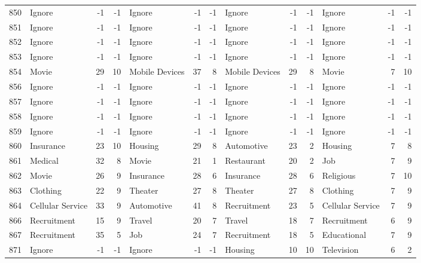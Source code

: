 \begin{figure}[htbp]
\begin{tabular}{rlrrlrrlrrlrr}
    850   & Ignore & -1    & -1    & Ignore & -1    & -1    & Ignore & -1    & -1    & Ignore & -1    & -1 \\
    851   & Ignore & -1    & -1    & Ignore & -1    & -1    & Ignore & -1    & -1    & Ignore & -1    & -1 \\
    852   & Ignore & -1    & -1    & Ignore & -1    & -1    & Ignore & -1    & -1    & Ignore & -1    & -1 \\
    853   & Ignore & -1    & -1    & Ignore & -1    & -1    & Ignore & -1    & -1    & Ignore & -1    & -1 \\
    854   & Movie & 29    & 10    & Mobile Devices & 37    & 8     & Mobile Devices & 29    & 8     & Movie & 7     & 10 \\
    856   & Ignore & -1    & -1    & Ignore & -1    & -1    & Ignore & -1    & -1    & Ignore & -1    & -1 \\
    857   & Ignore & -1    & -1    & Ignore & -1    & -1    & Ignore & -1    & -1    & Ignore & -1    & -1 \\
    858   & Ignore & -1    & -1    & Ignore & -1    & -1    & Ignore & -1    & -1    & Ignore & -1    & -1 \\
    859   & Ignore & -1    & -1    & Ignore & -1    & -1    & Ignore & -1    & -1    & Ignore & -1    & -1 \\
    860   & Insurance & 23    & 10    & Housing & 29    & 8     & Automotive & 23    & 2     & Housing & 7     & 8 \\
    861   & Medical & 32    & 8     & Movie & 21    & 1     & Restaurant & 20    & 2     & Job   & 7     & 9 \\
    862   & Movie & 26    & 9     & Insurance & 28    & 6     & Insurance & 28    & 6     & Religious & 7     & 10 \\
    863   & Clothing & 22    & 9     & Theater & 27    & 8     & Theater & 27    & 8     & Clothing & 7     & 9 \\
    864   & Cellular Service & 33    & 9     & Automotive & 41    & 8     & Recruitment & 23    & 5     & Cellular Service & 7     & 9 \\
    866   & Recruitment & 15    & 9     & Travel & 20    & 7     & Travel & 18    & 7     & Recruitment & 6     & 9 \\
    867   & Recruitment & 35    & 5     & Job   & 24    & 7     & Recruitment & 18    & 5     & Educational & 7     & 9 \\
    871   & Ignore & -1    & -1    & Ignore & -1    & -1    & Housing & 10    & 10    & Television & 6     & 2 \\

\end{tabular}
\end{figure}
